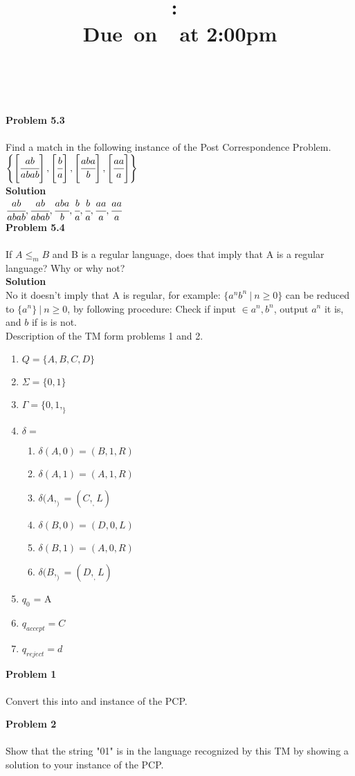 \documentclass{article}
\title{
  \vspace{2in}
  \textmd{\textbf{\hmwkClass:\ \hmwkTitle}}\\
  \normalsize\vspace{0.1in}\small{Due\ on\ \hmwkDueDate\ at 2:00pm}\\
  \vspace{0.1in}\large{\textit{\hmwkClassInstructor\ \hmwkClassTime}}
  \vspace{3in}
}
\author{\textbf{\hmwkAuthorName}}
\date{}
\newcommand\curl[1]{\{#1\}}
\newcommand{\problem}[1]{\large{\textbf{Problem #1}}\\}
\begin{document}
\maketitle

\pagebreak

\problem{5.3} \\
Find a match in the following instance of the Post Correspondence Problem.\\

$\left \{ \left [ \cfrac{ab}{abab} \right ], \left [ \cfrac{b}{a} \right ], \left [ \cfrac{aba}{b} \right ], \left [ \cfrac{aa}{a} \right ] \right \}$ \\

\textbf{Solution}\\

$  \cfrac{ab}{abab}  , \cfrac{ab}{abab}, \cfrac{aba}{b} , \cfrac{b}{a} , \cfrac{b}{a} ,   \cfrac{aa}{a}, \cfrac{aa}{a}  $  \\

\problem{5.4} \\

If $A \leq _m B$ and B is a regular language, does that imply that A is a regular language? Why or why not?\\

\textbf{Solution}\\

No it doesn't imply that A is regular, for example: $\curl{a^nb^n\ | \ n \geq 0}$ can be reduced to $\curl{a^n}\ |\ n \geq 0$, by 
following procedure:
Check if input $\in a^n,b^n$, output $a^n$ it is, and $b$ if is is not. \\

Description of the TM form problems 1 and 2.\\
\begin{enumerate}[1., leftmargin = 0.5cm]
\itemsep0em
\item $Q = \curl{A,B,C,D}$
\item $\Sigma = \curl{0,1}$
\item $\Gamma = \curl{0,1,_}$
\item $\delta = $
    \begin{enumerate}[1., leftmargin = 0.5cm]
    \itemsep0em
    \item $\delta (A,0) = (B,1,R)$
    \item $\delta (A,1) = (A,1,R)$
    \item $\delta (A,_) = (C,_,L)$

    \item $\delta (B,0) = (D,0,L)$
    \item $\delta (B,1) = (A,0,R)$
    \item $\delta (B,_) = (D,_,L)$
    \end{enumerate}
\item $q_0$ = A
\item  $q_{accept} = C$
\item  $q_{reject} = d$
\end{enumerate}

\problem{1} \\
Convert this into and instance of the PCP.

\problem{2} \\
Show that the string "01" is in the language recognized by this TM by showing a solution to your instance of the PCP.
\end{document}
